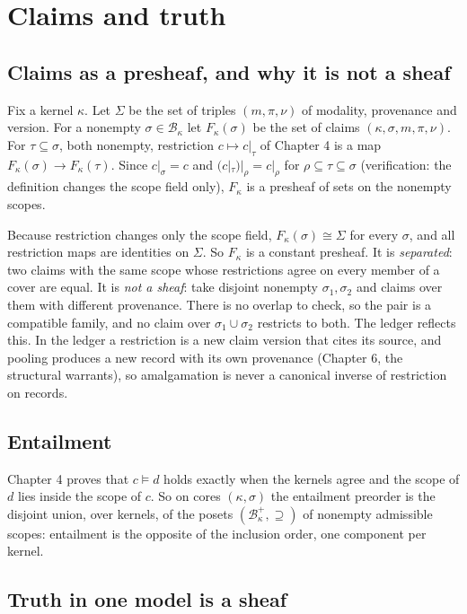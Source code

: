 \documentclass[11pt]{article}
\theoremstyle{plain}
\theoremstyle{definition}
\theoremstyle{remark}
\newcommand{\B}{\mathcal{B}}
\begin{document}
\section{Claims and truth}\label{sec:claims}

\subsection{Claims as a presheaf, and why it is not a sheaf}

Fix a kernel $\kappa$. Let $\Sigma$ be the set of triples $(m,\pi,\nu)$ of modality, provenance and version. For a nonempty $\sigma\in\B_\kappa$ let $F_\kappa(\sigma)$ be the set of claims $(\kappa,\sigma,m,\pi,\nu)$. For $\tau\subseteq\sigma$, both nonempty, restriction $c\mapsto c|_\tau$ of Chapter 4 is a map $F_\kappa(\sigma)\to F_\kappa(\tau)$. Since $c|_\sigma=c$ and $(c|_\tau)|_\rho=c|_\rho$ for $\rho\subseteq\tau\subseteq\sigma$ (verification: the definition changes the scope field only), $F_\kappa$ is a presheaf of sets on the nonempty scopes.

Because restriction changes only the scope field, $F_\kappa(\sigma)\cong\Sigma$ for every $\sigma$, and all restriction maps are identities on $\Sigma$. So $F_\kappa$ is a constant presheaf. It is \emph{separated}: two claims with the same scope whose restrictions agree on every member of a cover are equal. It is \emph{not a sheaf}: take disjoint nonempty $\sigma_1,\sigma_2$ and claims over them with different provenance. There is no overlap to check, so the pair is a compatible family, and no claim over $\sigma_1\cup\sigma_2$ restricts to both. The ledger reflects this. In the ledger a restriction is a new claim version that cites its source, and pooling produces a new record with its own provenance (Chapter 6, the structural warrants), so amalgamation is never a canonical inverse of restriction on records.

\subsection{Entailment}

Chapter 4 proves that $c\models d$ holds exactly when the kernels agree and the scope of $d$ lies inside the scope of $c$. So on cores $(\kappa,\sigma)$ the entailment preorder is the disjoint union, over kernels, of the posets $(\B_\kappa^{+},\supseteq)$ of nonempty admissible scopes: entailment is the opposite of the inclusion order, one component per kernel.

\subsection{Truth in one model is a sheaf}
\end{document}
